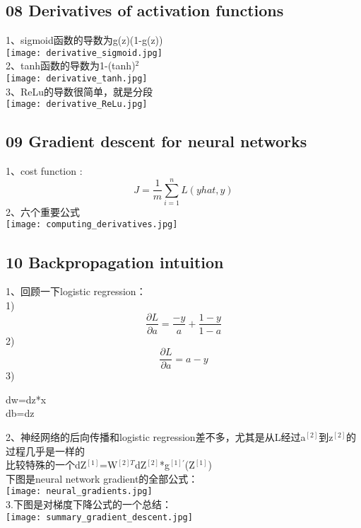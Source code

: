 \documentclass[a4paper,12pt]{article}
\begin{document}
\begin{CJK*}{UTF8}{gbsn}
\subsection{08 Derivatives of activation functions}
\begin{flushleft}
1、sigmoid函数的导数为g(z)(1-g(z))\\
\texttt{[image: derivative\_sigmoid.jpg]}\\
2、tanh函数的导数为1-(tanh)$^2$\\
\texttt{[image: derivative\_tanh.jpg]}\\
3、ReLu的导数很简单，就是分段\\
\texttt{[image: derivative\_ReLu.jpg]}\\
\end{flushleft}
\subsection{09 Gradient descent for neural networks}
\begin{flushleft}
1、cost function :\\
\begin{equation*}
J = \frac{1}{m}\sum_{i=1}^nL(yhat,y)   
\end{equation*}
2、六个重要公式\\
\texttt{[image: computing\_derivatives.jpg]}\\
\end{flushleft}
\subsection{10 Backpropagation intuition}
\begin{flushleft}
1、回顾一下logistic regression：\\
1)\[ \frac{\partial L}{\partial a}
=\left. \frac{-y}{a}
+ \frac{1-y}{1-a}\right.\]
2) \[ \frac{\partial L}{\partial a}=a-y\]
3)
\begin{center}
dw=dz*x\\
db=dz\\
\end{center}
2、神经网络的后向传播和logistic regression差不多，尤其是从L经过a$^{[2]}$到z$^{[2]}$的过程几乎是一样的\\
比较特殊的一个dZ$^{[1]}$=W$^{[2]T}$dZ$^{[2]}$*g$^{[1]'}$(Z$^{[1]}$)\\
下图是neural network gradient的全部公式：\\
\texttt{[image: neural\_gradients.jpg]}\\
3.下图是对梯度下降公式的一个总结：\\
\texttt{[image: summary\_gradient\_descent.jpg]}\\
\end{flushleft}

\end{CJK*}
\end{document}
